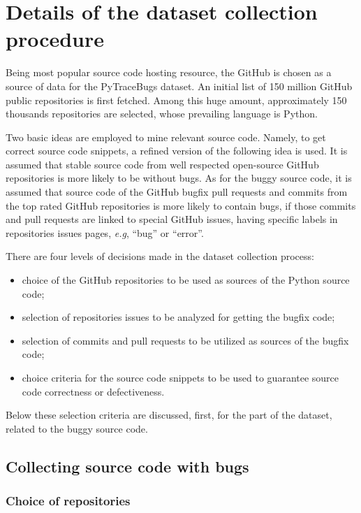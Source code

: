 \documentclass[10pt,conference]{IEEEtran}
\begin{document}
\section{Details of the dataset collection procedure}\label{sec7}

Being most popular source code hosting resource, 
the GitHub is chosen as a source of data for the PyTraceBugs dataset.
An initial list of 150 million GitHub public repositories is first fetched. Among this huge amount, approximately 150 thousands repositories
are selected, whose prevailing language is Python.

Two basic ideas are employed to mine relevant source code.
Namely, to get correct source code snippets, a refined version of the following idea is
used. It is assumed that stable source code from well respected open-source GitHub repositories is more likely to be without bugs. 
As for the buggy source code, it is assumed
that source code of the GitHub bugfix pull requests and commits from the top rated GitHub repositories
is more likely to contain bugs, if those commits and pull requests are linked to
special GitHub issues, having specific labels in repositories issues pages, \textit{e.g}, ``bug'' or ``error''.

There are four levels of decisions made in the dataset collection process:
\begin{itemize}
\item choice of the GitHub repositories to be used as sources of the Python source code;

\item selection of repositories issues to be analyzed for getting the bugfix code;

\item selection of commits and pull requests to be utilized as sources of the bugfix code;

\item choice criteria for the source code snippets to be used to guarantee source code correctness or defectiveness.
\end{itemize}
Below these selection criteria are discussed, first, for the part of the dataset, related to the buggy source code.

\subsection{Collecting source code with bugs}

\subsubsection{Choice of repositories}
\end{document}
